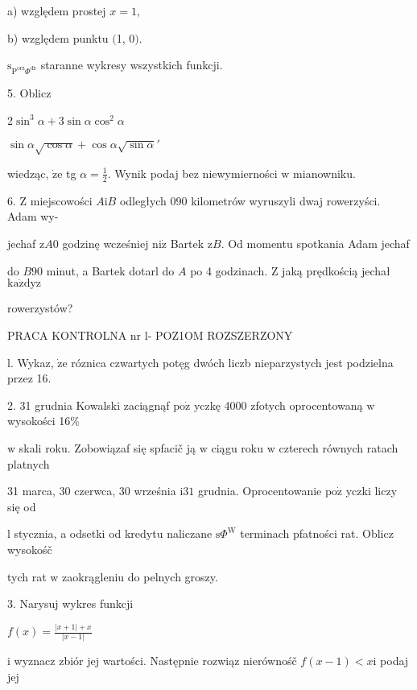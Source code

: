 \documentclass[a4paper,12pt]{article}
\begin{document}
a) względem prostej $x=1,$

b) względem punktu $($1, $0).$

$\mathrm{s}_{\mathrm{P}^{\mathrm{o}\mathrm{r}\mathrm{z}}\Phi^{\mathrm{d}\acute{\mathrm{z}}}}$ staranne wykresy wszystkich funkcji.

5. Oblicz

2$\sin^{3}\alpha+3\sin\alpha\cos^{2}\alpha$

$\sin\alpha\sqrt{\cos\alpha}+\cos\alpha\sqrt{\sin\alpha}'$

wiedząc, $\dot{\mathrm{z}}\mathrm{e}$ tg $\displaystyle \alpha=\frac{1}{2}$. Wynik podaj bez niewymierności $\mathrm{w}$ mianowniku.

6. $\mathrm{Z}$ miejscowości $A\mathrm{i}B$ odległych $090$ kilometrów wyruszyli dwaj rowerzyści. Adam wy-

jechaf $\mathrm{z} A0$ godzinę wcześniej $\mathrm{n}\mathrm{i}\dot{\mathrm{z}}$ Bartek $\mathrm{z} B$. Od momentu spotkania Adam jechaf

do $B90$ minut, a Bartek dotarl do $A$ po 4 godzinach. $\mathrm{Z}$ jaką prędkością jechał $\mathrm{k}\mathrm{a}\dot{\mathrm{z}}\mathrm{d}\mathrm{y}\mathrm{z}$

rowerzystów?




PRACA KONTROLNA nr l- POZ1OM ROZSZERZONY

l. Wykaz, $\dot{\mathrm{z}}\mathrm{e}$ róznica czwartych potęg dwóch liczb nieparzystych jest podzielna przez 16.

2. 31 grudnia Kowalski zaciągnąf $\mathrm{p}\mathrm{o}\dot{\mathrm{z}}$ yczkę 4000 zfotych oprocentowaną $\mathrm{w}$ wysokości 16\%

$\mathrm{w}$ skali roku. Zobowiązaf się spfacič ją $\mathrm{w}$ ciągu roku $\mathrm{w}$ czterech równych ratach platnych

31 marca, 30 czerwca, 30 września $\mathrm{i}31$ grudnia. Oprocentowanie $\mathrm{p}\mathrm{o}\dot{\mathrm{z}}$ yczki liczy się od

l stycznia, a odsetki od kredytu naliczane $\mathrm{s}\Phi^{\mathrm{W}}$ terminach pfatności rat. Oblicz wysokośč

tych rat $\mathrm{w}$ zaokrągleniu do pelnych groszy.

3. Narysuj wykres funkcji

$f(x)=\displaystyle \frac{|x+1|+x}{|x-1|}$

$\mathrm{i}$ wyznacz zbiór jej wartości. Następnie rozwiąz nierównośč $f(x-1) < x \mathrm{i}$ podaj jej
\end{document}
